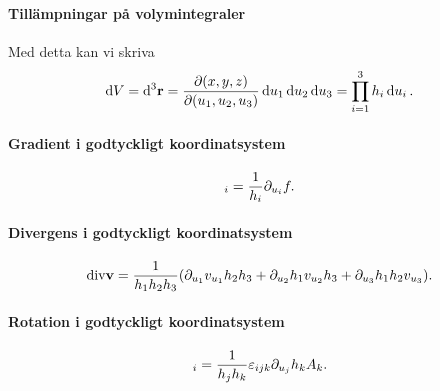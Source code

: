 \paragraph{Tillämpningar på volymintegraler}
Med detta kan vi skriva
\begin{align*}
	\dd{V} = \dd^3{\vb{r}} = \pdv{(x, y, z)}{(u_1, u_2, u_3)}\dd{u_1}\dd{u_2}\dd{u_3} = \prod\limits_{i = 1}^{3}h_{i}\dd{u_{i}}.
\end{align*}

\paragraph{Gradient i godtyckligt koordinatsystem}
\begin{align*}
	[\grad{f}]_i = \frac{1}{h_i}\del{u_i}{f}.
\end{align*}

\paragraph{Divergens i godtyckligt koordinatsystem}
\begin{align*}
	\text{div}\vb{v} = \frac{1}{h_1h_2h_3}(\partial_{u_1}v_{u_1}h_2h_3 + \partial_{u_2}h_1v_{u_2}h_3 + \partial_{u_3}h_1h_2v_{u_3}).
\end{align*}

\paragraph{Rotation i godtyckligt koordinatsystem}
\begin{align*}
	[\curl{\vb{v}}]_i = \frac{1}{h_jh_k}\leci{ijk}\del{u_j}{h_kA_k}.
\end{align*}